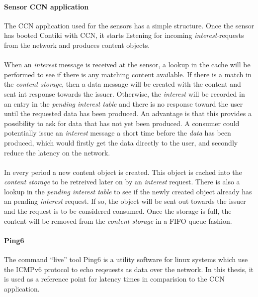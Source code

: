 \paragraph{Sensor CCN application}
The CCN application used for the sensors has a simple structure. Once the sensor has booted Contiki with CCN, it starts listening for incoming \textit{interest}-requests from the network and produces content objects.\\\\
When an \textit{interest} message is received at the sensor, a lookup in the cache will be performed to see if there is any matching content available. If there is a match in the \textit{content storage}, then a data message will be created with the content and sent int response towards the issuer. Otherwise, the \textit{interest} will be recorded in an entry in the \textit{pending interest table} and there is no response toward the user until the requested data has been produced.
An advantage is that this provides a possibility to ask for data that has not yet been produced. 
A consumer could potentially issue an \textit{interest} message a short time before the \textit{data} has been produced, which would firstly get the data directly to the user, and secondly reduce the latency on the network. 
\\\\
In every period a new content object is created. This object is cached into the \textit{content storage} to be retreived later on by an \textit{interest} request. There is also a lookup in the \textit{pending interest table} to see if the newly created object already has an pending \textit{interest} request. If so, the object will be sent out towards the issuer and the request is to be considered consumed. Once the storage is full, the content will be removed from the \textit{content storage} in a FIFO-queue fashion.


\paragraph{Ping6}
The command ``live'' tool Ping6 is a utility software for linux systems which use the ICMPv6 protocol to echo reqeuests as data over the network. In this thesis, it is used as a reference point for latency times in comparision to the CCN application.

